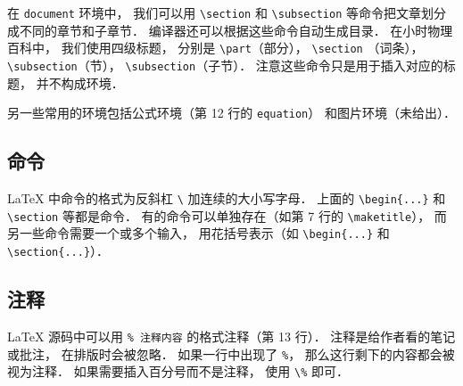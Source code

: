 在 \lstinline|document| 环境中， 我们可以用 \lstinline|\section| 和 \lstinline|\subsection| 等命令把文章划分成不同的章节和子章节． 编译器还可以根据这些命令自动生成目录． 在小时物理百科中， 我们使用四级标题， 分别是 \lstinline|\part|（部分）， \lstinline|\section| （词条）， \lstinline|\subsection|（节）， \lstinline|\subsection|（子节）． 注意这些命令只是用于插入对应的标题， 并不构成环境．

另一些常用的环境包括公式环境（第 12 行的 \lstinline|equation|） 和图片环境（未给出）．

\subsection{命令}
LaTeX 中命令的格式为反斜杠 \lstinline|\| 加连续的大小写字母． 上面的 \lstinline|\begin{...}| 和 \lstinline|\section| 等都是命令． 有的命令可以单独存在（如第 7 行的 \lstinline|\maketitle|）， 而另一些命令需要一个或多个输入， 用花括号表示（如 \lstinline|\begin{...}| 和 \lstinline|\section{...}|）．

\subsection{注释}
LaTeX 源码中可以用 \lstinline|% 注释内容| 的格式注释（第 13 行）． 注释是给作者看的笔记或批注， 在排版时会被忽略． 如果一行中出现了 \lstinline|%|， 那么这行剩下的内容都会被视为注释． 如果需要插入百分号而不是注释， 使用 \lstinline|\%| 即可．


